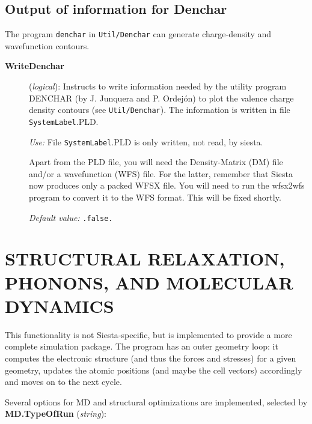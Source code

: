 \documentclass[11pt]{article}
\begin{document}
\vspace{5pt}
\subsection{Output of information for Denchar}

The program {\tt denchar} in {\tt Util/Denchar} can generate
charge-density and wavefunction contours.

\begin{description}

\item[{\bf WriteDenchar}] ({\it logical}):  
  Instructs to write information needed by the utility program DENCHAR
  (by J. Junquera and P. Ordej\'on) to plot the valence charge density
  contours (see {\tt Util/Denchar}). The information is written in
  file {\tt SystemLabel}.PLD.

{\it Use:} File {\tt SystemLabel}.PLD is only written, not read, by siesta.

Apart from the PLD file, you will need the Density-Matrix (DM) file
and/or a wavefunction (WFS) file. For the latter, remember that Siesta
now produces only a packed WFSX file. You will need to run the
wfsx2wfs program to convert it to the WFS format. This will be fixed
shortly.

{\it Default value:} {\tt .false.}

\end{description}


\vspace{5pt}
\section{STRUCTURAL RELAXATION, PHONONS, AND MOLECULAR DYNAMICS}

This functionality is not {\sc Siesta}-specific, but is implemented to
provide a more complete simulation package. The program has an outer
geometry loop: it computes the electronic structure (and
thus the forces and stresses) for a given geometry, updates the
atomic positions (and maybe the cell vectors) accordingly and moves on
to the next cycle.

Several options for MD and structural optimizations are
implemented, selected by
{\bf MD.TypeOfRun} ({\it string}):
\end{document}
